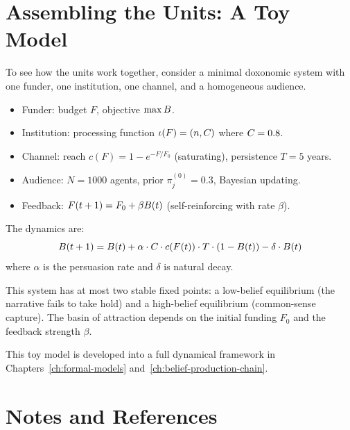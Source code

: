 \section{Assembling the Units: A Toy Model}
\label{sec:ch4-toy}

To see how the units work together, consider a minimal doxonomic system with one funder, one institution, one channel, and a homogeneous audience.

\begin{model}
\label{mod:minimal}
\begin{itemize}[nosep]
  \item Funder: budget $F$, objective $\max B_{}$.
  \item Institution: processing function $\iota(F) = (n, C_{})$ where $C_{} = 0.8$.
  \item Channel: reach $c(F) = 1 - e^{-F/F_0}$ (saturating), persistence $T = 5$ years.
  \item Audience: $N = 1000$ agents, prior $\pi_j^{(0)} = 0.3$, Bayesian updating.
  \item Feedback: $F(t+1) = F_0 + \beta B_{}(t)$ (self-reinforcing with rate $\beta$).
\end{itemize}
The dynamics are:
\[
  B_{}(t+1) = B_{}(t) + \alpha \cdot C_{} \cdot c(F(t)) \cdot T \cdot (1 - B_{}(t)) - \delta \cdot B_{}(t)
\]
where $\alpha$ is the persuasion rate and $\delta$ is natural decay.

This system has at most two stable fixed points: a low-belief equilibrium (the narrative fails to take hold) and a high-belief equilibrium (common-sense capture).
The basin of attraction depends on the initial funding $F_0$ and the feedback strength $\beta$.
\end{model}

This toy model is developed into a full dynamical framework in Chapters~\ref{ch:formal-models} and~\ref{ch:belief-production-chain}.


\section{Notes and References}
\label{sec:ch4-notes}

